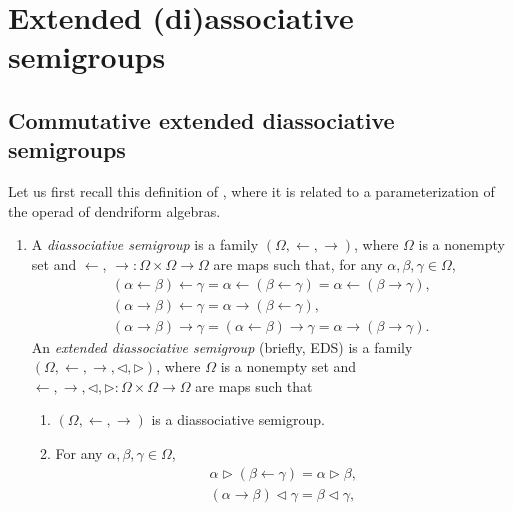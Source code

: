 \documentclass[pdftex]{sigma}
\numberwithin{equation}{section}
\begin{document}
\section{Extended (di)associative semigroups}

\subsection{Commutative extended diassociative semigroups}

Let us first recall this definition of \cite{Foissy49}, where it is related to a parameterization of the operad of dendriform algebras.

\begin{Definition}\qquad
\begin{enumerate}\itemsep=0pt
\item[(1)] A \emph{diassociative semigroup} is a family $(\Omega,\leftarrow,\rightarrow)$, where $\Omega$ is a nonempty set and $\leftarrow$, $\rightarrow\colon\Omega\times \Omega \longrightarrow \Omega$ are maps such that, for any $\alpha,\beta,\gamma\in \Omega$,
\begin{gather}%
\label{eq1} (\alpha \leftarrow \beta)\leftarrow \gamma=\alpha\leftarrow (\beta \leftarrow \gamma)=\alpha \leftarrow(\beta \rightarrow \gamma),\\
 (\alpha \rightarrow \beta)\leftarrow \gamma=\alpha \rightarrow (\beta \leftarrow \gamma),\\
 (\alpha \rightarrow \beta)\rightarrow \gamma=(\alpha \leftarrow \beta) \rightarrow \gamma=\alpha \rightarrow (\beta \rightarrow \gamma).
\end{gather}
An \emph{extended diassociative semigroup} (briefly, EDS) is a family $(\Omega,\leftarrow,\rightarrow,\triangleleft,\triangleright)$, where $\Omega$ is a nonempty set
and $\leftarrow,\rightarrow,\triangleleft,\triangleright\colon\Omega\times \Omega \longrightarrow \Omega$ are maps such that
\begin{enumerate}\itemsep=0pt
\item $(\Omega,\leftarrow,\rightarrow)$ is a diassociative semigroup.
\item For any $\alpha,\beta,\gamma \in \Omega$,
\begin{gather}%
\alpha\triangleright (\beta \leftarrow \gamma)=\alpha \triangleright \beta,\\
(\alpha \rightarrow \beta)\triangleleft \gamma=\beta \triangleleft \gamma, \\

\end{gather}
\end{enumerate}
\end{enumerate}
\end{Definition}
\end{document}
